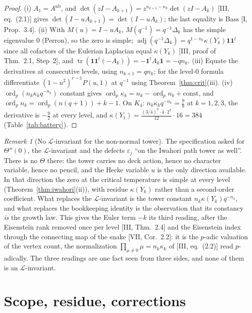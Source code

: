 \documentclass[11pt]{amsart}
\numberwithin{equation}{section}
\theoremstyle{definition}
\theoremstyle{remark}
\newtheorem{remark}[theorem]{Remark}
\newcommand{\cL}{\mathcal{L}}
\newcommand{\ord}{\operatorname{ord}}
\newcommand{\tr}{\operatorname{tr}}
\newcommand{\adj}{\operatorname{adj}}
\newcommand{\Anb}{A^{\mathrm{nb}}}
\begin{document}
\begin{proof}
(i) $A_1=\Anb$, and $\det(zI-A_{k+1})=z^{n_{k+1}-n_k}\det(zI-A_k)$ [III, eq.~(2.1)] gives
$\det(I-uA_{k+1})=\det(I-uA_k)$; the last equality is Bass [I, Prop.~3.4]. (ii) With
$M(u)=I-uA_k$, $M(q^{-1})=q^{-1}\Delta_k$ has the simple eigenvalue $0$ (Perron), so the
zero is simple; $\adj(q^{-1}\Delta_k)=q^{1-n_k}\kappa(Y_k)\mathbf1\mathbf1^{t}$ since all
cofactors of the Eulerian Laplacian equal $\kappa(Y_k)$ [III, proof of Thm.~2.1, Step~2],
and $\tr(\mathbf1\mathbf1^{t}(-A_k))=-\mathbf1^{t}A_k\mathbf1=-qn_k$. (iii) Equate the
derivatives at consecutive levels, using $n_{k+1}=qn_k$; for the level-$0$ formula
differentiate $(1-u^{2})^{r-1}P(u,1)$ at $q^{-1}$ using Theorem~\ref{thm:crit}(iii). (iv)
$\ord_p(n_k\kappa_kq^{-n_k})$ constant gives $\ord_p\kappa_k=n_k-\ord_pn_k+\mathrm{const}$,
and $\ord_pn_k=\ord_p(n(q{+}1))+k-1$. On $K_4$: $n_k\kappa_kq^{-n_k}=\frac98$ at
$k=1,2,3$, the derivative is $-\frac92$ at every level, and
$\kappa(Y_1)=\frac{(3/4)^{2}\cdot4\cdot2^{7}}{12}\cdot16=384$ (Table~\ref{tab:battery}).
\end{proof}

\begin{remark}[No $\cL$-invariant for the non-normal tower]\label{rem:noL}
The specification asked for $\Theta''(0)$, the $\cL$-invariant and the defects
$\varepsilon_j$ ``on the Iwahori path tower as well''. There is no $\Theta$ there: the
tower carries no deck action, hence no character variable, hence no pencil, and the
Hecke variable $u$ is the only direction available. In that direction the zero at the
critical temperature is simple at every level (Theorem~\ref{thm:iwahori}(ii)), with
residue $\kappa(Y_k)$ rather than a second-order coefficient. What replaces the
$\cL$-invariant is the tower constant $n_k\kappa(Y_k)q^{-n_k}$, and what replaces the
bookkeeping identity is the observation that its constancy \emph{is} the growth law.
This gives the Euler term $-k$ its third reading, after the Eisenstein rank removed
once per level [III, Thm.~2.4] and the Eisenstein index through the connecting map of
the snake [VII, Cor.~2.2]: it is the $p$-adic valuation of the vertex count, the
normalization $\prod_{\mu\neq0}\mu=n_k\kappa_k$ of [III, eq.~(2.2)] read $p$-adically.
The three readings are one fact seen from three sides, and none of them is an
$\cL$-invariant.
\end{remark}

\section{Scope, residue, corrections}\label{sec:scope}
\end{document}
